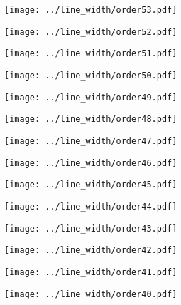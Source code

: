\documentclass{article}
\begin{document}
\begin{figure}[H]
    \centering
    \texttt{[image: ../line\_width/order53.pdf]}
\end{figure}
\begin{figure}[H]
    \centering
    \texttt{[image: ../line\_width/order52.pdf]}
\end{figure}
\begin{figure}[H]
    \centering
    \texttt{[image: ../line\_width/order51.pdf]}
\end{figure}
\begin{figure}[H]
    \centering
    \texttt{[image: ../line\_width/order50.pdf]}
\end{figure}
\begin{figure}[H]
    \centering
    \texttt{[image: ../line\_width/order49.pdf]}
\end{figure}
\begin{figure}[H]
    \centering
    \texttt{[image: ../line\_width/order48.pdf]}
\end{figure}
\begin{figure}[H]
    \centering
    \texttt{[image: ../line\_width/order47.pdf]}
\end{figure}
\begin{figure}[H]
    \centering
    \texttt{[image: ../line\_width/order46.pdf]}
\end{figure}
\begin{figure}[H]
    \centering
    \texttt{[image: ../line\_width/order45.pdf]}
\end{figure}
\begin{figure}[H]
    \centering
    \texttt{[image: ../line\_width/order44.pdf]}
\end{figure}
\begin{figure}[H]
    \centering
    \texttt{[image: ../line\_width/order43.pdf]}
\end{figure}
\begin{figure}[H]
    \centering
    \texttt{[image: ../line\_width/order42.pdf]}
\end{figure}
\begin{figure}[H]
    \centering
    \texttt{[image: ../line\_width/order41.pdf]}
\end{figure}
\begin{figure}[H]
    \centering
    \texttt{[image: ../line\_width/order40.pdf]}
\end{figure}
\end{document}
